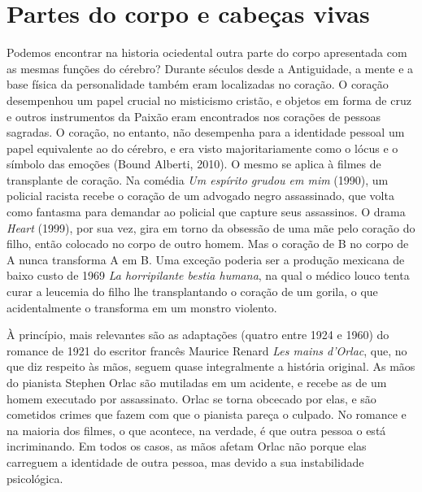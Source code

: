 \section{Partes do corpo e cabeças vivas}

Podemos encontrar na historia ociedental outra parte do corpo
apresentada com as mesmas funções do cérebro? Durante séculos desde a
Antiguidade, a mente e a base física da personalidade também eram
localizadas no coração. O coração desempenhou um papel crucial no
misticismo cristão, e objetos em forma de cruz e outros instrumentos da
Paixão eram encontrados nos corações de pessoas sagradas. O coração, no
entanto, não desempenha para a identidade pessoal um papel equivalente
ao do cérebro, e era visto majoritariamente como o lócus e o símbolo das
emoções (Bound Alberti, 2010). O mesmo se aplica à filmes de transplante
de coração. Na comédia \emph{Um espírito grudou em mim} (1990), um
policial racista recebe o coração de um advogado negro assassinado, que
volta como fantasma para demandar ao policial que capture seus
assassinos. O drama \emph{Heart} (1999), por sua vez, gira em torno da
obsessão de uma mãe pelo coração do filho, então colocado no corpo de
outro homem. Mas o coração de B no corpo de A nunca transforma A em B.
Uma exceção poderia ser a produção mexicana de baixo custo de 1969
\emph{La horripilante bestia humana}, na qual o médico louco tenta curar
a leucemia do filho lhe transplantando o coração de um gorila, o que
acidentalmente o transforma em um monstro violento.

À princípio, mais relevantes são as adaptações (quatro entre 1924 e
1960) do romance de 1921 do escritor francês Maurice Renard \emph{Les
mains d'Orlac}, que, no que diz respeito às mãos, seguem quase
integralmente a história original. As mãos do pianista Stephen Orlac são
mutiladas em um acidente, e recebe as de um homem executado por
assassinato. Orlac se torna obcecado por elas, e são cometidos crimes
que fazem com que o pianista pareça o culpado. No romance e na maioria
dos filmes, o que acontece, na verdade, é que outra pessoa o está
incriminando. Em todos os casos, as mãos afetam Orlac não porque elas
carreguem a identidade de outra pessoa, mas devido a sua instabilidade
psicológica.


